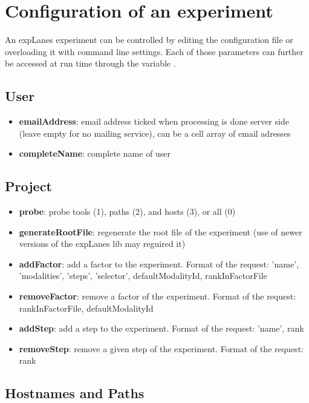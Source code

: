 \documentclass[a4paper,fleqn]{tufte-handout}
\newcommand{\explanes}{\textsf{expLanes} }
\begin{document}
\section{Configuration of an experiment}

An \explanes experiment can be controlled by editing the configuration file or overloading it with command line settings. Each of those parameters can further be accessed at run time through the variable .

\subsection{User}

\begin{itemize}
\item \textbf{emailAddress}: email address ticked when processing is done server side (leave empty for no mailing service), can be a cell array of email adresses
\item \textbf{completeName}: complete name of user
\end{itemize}

\subsection{Project}

\begin{itemize}
\item \textbf{probe}: probe tools (1), paths (2), and hosts (3), or all (0)
\item \textbf{generateRootFile}: regenerate the root file of the experiment (use of newer versions of the expLanes lib may reguired it)
\item \textbf{addFactor}: add a factor to the experiment. Format of the request: {'name', 'modalities', 'steps', 'selector', defaultModalityId, rankInFactorFile}
\item \textbf{removeFactor}: remove a factor of the experiment. Format of the request: {rankInFactorFile, defaultModalityId}
\item \textbf{addStep}: add a step to the experiment. Format of the request: {'name', rank}
\item \textbf{removeStep}: remove a given step of the experiment. Format of the request: rank
\end{itemize}

\subsection{Hostnames and Paths}
\end{document}
